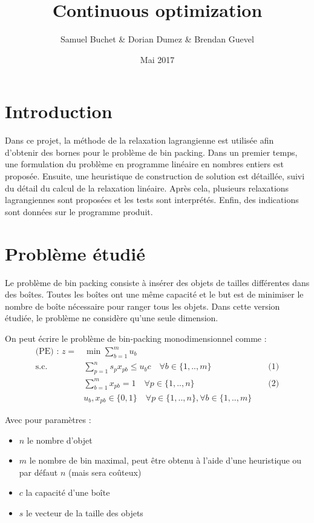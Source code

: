 \documentclass{article}
\title{Continuous optimization}
\author{Samuel Buchet \& Dorian Dumez \& Brendan Guevel}
\date{Mai 2017}
\begin{document}
\maketitle

\section{Introduction}

Dans ce projet, la méthode de la relaxation lagrangienne est utilisée afin d'obtenir des bornes pour le problème de bin packing.
Dans un premier temps, une formulation du problème en programme linéaire en nombres entiers est proposée.
Ensuite, une heuristique de construction de solution est détaillée, suivi du détail du calcul de la relaxation linéaire.
Après cela, plusieurs relaxations lagrangiennes sont proposées et les tests sont interprétés.
Enfin, des indications sont données sur le programme produit.

\section{Problème étudié}

Le problème de bin packing consiste à insérer des objets de tailles différentes dans des boîtes.
Toutes les boîtes ont une même capacité et le but est de minimiser le nombre de boîte nécessaire pour ranger tous les objets.
Dans cette version étudiée, le problème ne considère qu'une seule dimension.\newline

On peut écrire le problème de bin-packing monodimensionnel comme :\\

\begin{align*}
    \text{(PE) : } z = &\text{ min } \sum \limits_{b = 1 }^{m} u_b \\
    \text{s.c.  } &\sum \limits_{p = 1}^{n} s_p x_{pb} \leqslant u_b c \quad \forall b \in \{1, .., m\} &&\text{ (1)}\\
    &\sum \limits_{b = 1}^{m} x_{pb} = 1 \quad \forall p \in \{1, .., n\} &&\text{ (2)} \\
    &u_b , x_{pb} \in \{0,1\} \quad \forall p \in \{ 1, .., n\}, \forall b \in \{1, .., m\}
\end{align*}

Avec pour paramètres :
\begin{itemize}
    \item $n$ le nombre d'objet
    \item $m$ le nombre de bin maximal, peut être obtenu à l'aide d'une heuristique ou par défaut $n$ (mais sera coûteux)
    \item $c$ la capacité d'une boîte
    \item $s$ le vecteur de la taille des objets
\end{itemize}
\end{document}
